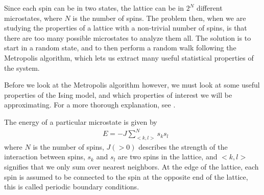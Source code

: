 \documentclass[reprint,english,notitlepage]{revtex4-1}
\begin{document}
	Since each spin can be in two states, the lattice can be in $2^N$ different microstates, where $N$ is the number of spins. The problem then, when we are studying the properties of a lattice with a non-trivial number of spins, is that there are too many possible microstates to analyze them all. The solution is to start in a random state, and to then perform a random walk following the Metropolis algorithm, which lets us extract many useful statistical properties of the system.
	
	Before we look at the Metropolis algorithm however, we must look at some useful properties of the Ising model, and which properties of interest we will be approximating. For a more thorough explanation, see \cite{compfys}.

	The energy of a particular microstate is given by
	\begin{equation}
	\label{eq:E}
	\begin{aligned}
	&E = -J \sum_{<k,l>}^{N} s_k s_l
	\end{aligned}
	\end{equation}
	where $N$ is the number of spins, $J (> 0)$ describes the strength of the interaction between spins, $s_k$ and $s_l$ are two spins in the lattice, and $<k,l>$ signifies that we only sum over nearest neighbors. At the edge of the lattice, each spin is assumed to be connected to the spin at the opposite end of the lattice, this is called periodic boundary conditions.
	
\end{document}
